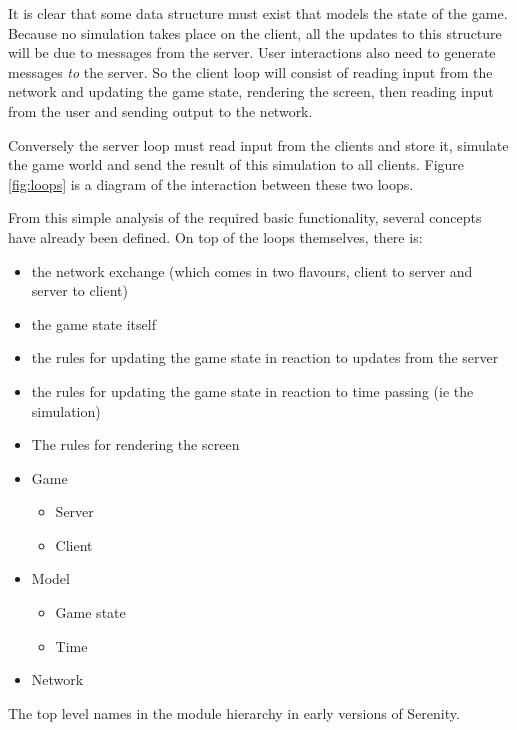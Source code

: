 It is clear that some data structure must exist that models the state of the game. Because no simulation takes place on the client, all the updates to this structure will be due to messages from the server. User interactions also need to generate messages \emph{to} the server. So the client loop will consist of reading input from the network and updating the game state, rendering the screen, then reading input from the user and sending output to the network.

Conversely the server loop must read input from the clients and store it, simulate the game world and send the result of this simulation to all clients. Figure \ref{fig:loops} is a diagram of the interaction between these two loops.

From this simple analysis of the required basic functionality, several concepts have already been defined. On top of the loops themselves, there is:

\begin{itemize}\itemsep-3pt
    \item the network exchange (which comes in two flavours, client to server and server to client) 
    \item the game state itself
    \item the rules for updating the game state in reaction to updates from the server
    \item the rules for updating the game state in reaction to time passing (ie the simulation)
    \item The rules for rendering the screen
\end{itemize}

\begin{marginfigure}
	\begin{itemize}\parskip-3pt
    \item Game \begin{itemize}\itemsep-3pt
            \item Server
            \item Client
        \end{itemize}
    \item Model\begin{itemize}\itemsep-3pt
            \item Game state
            \item Time
        \end{itemize}
    \item Network
\end{itemize}
	\caption[The top level names in the module hierarchy in early versions of Serenity.]{The top level names in the module hierarchy in early versions of Serenity.}
	\label{fig:loops}
\end{marginfigure}

